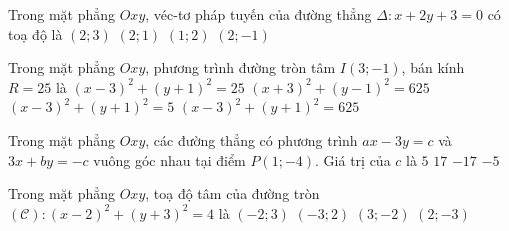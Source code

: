 \begin{ex}%
	Trong mặt phẳng $O x y$, véc-tơ pháp tuyến của đường thẳng $\Delta\colon x+2 y+3=0$ có toạ độ là
	\choice
	{$(2 ; 3)$}
	{$(2 ; 1)$}
	{\True$(1 ; 2)$}
	{$(2 ;-1)$}
\end{ex}




\begin{ex}%
	Trong mặt phẳng $O x y$, phương trình đường tròn tâm $I(3 ;-1)$, bán kính $R=25$ là
	\choice
	{$(x-3)^2+(y+1)^2=25$}
	{$(x+3)^2+(y-1)^2=625$}
	{$(x-3)^2+(y+1)^2=5$}
	{\True$(x-3)^2+(y+1)^2=625$}
	
\end{ex}


\begin{ex}%
	Trong mặt phẳng $O x y$, các đường thẳng có phương trình $a x-3 y=c$ và $3 x+b y=-c$ vuông góc nhau tại điểm $P(1 ;-4)$. Giá trị của $c$ là
	\choice
	{$ 5 $}
	{\True$ 17 $}
	{$ -17 $}
	{$ -5 $}
\end{ex}



\begin{ex}%
	Trong mặt phẳng $O x y$, toạ độ tâm của đường tròn $(\mathscr{C})\colon(x-2)^2+(y+3)^2=4$ là
	\choice
	{$(-2 ; 3)$}
	{$(-3 ; 2)$}
	{$(3 ;-2)$}
	{\True$(2 ;-3)$}
\end{ex}





